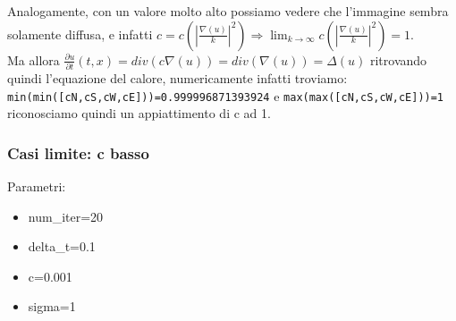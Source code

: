 Analogamente, con un valore molto alto possiamo vedere che l'immagine sembra solamente diffusa, e infatti $c=c(|\frac{\nabla(u)}{k}|^2)\Longrightarrow\lim_{k\to\infty}c(|\frac{\nabla(u)}{k}|^2)=1$.\\
Ma allora $\frac{\partial u}{\partial t}(t,x)=div(c\nabla(u))=div(\nabla(u))=\Delta(u)$ ritrovando quindi l'equazione del calore, numericamente infatti troviamo:
\texttt{min(min([cN,cS,cW,cE]))=0.999996871393924} e \texttt{max(max([cN,cS,cW,cE]))=1}
riconosciamo quindi un appiattimento di c ad 1.

\newpage
\subsubsection{Casi limite: c basso}
Parametri:
\begin{itemize}
    \item num\_iter=20
    \item delta\_t=0.1
    \item c=0.001
    \item sigma=1
\end{itemize}

